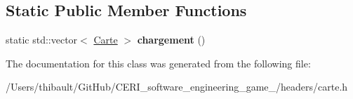 \subsection*{Static Public Member Functions}
\begin{DoxyCompactItemize}
\item 
\mbox{\label{class_carte_aa8b61802fbfda274148ef7b639f0fec8}} 
static std\+::vector$<$ \hyperlink{class_carte}{Carte} $>$ {\bfseries chargement} ()
\end{DoxyCompactItemize}


The documentation for this class was generated from the following file\+:\begin{DoxyCompactItemize}
\item 
/\+Users/thibault/\+Git\+Hub/\+C\+E\+R\+I\+\_\+software\+\_\+engineering\+\_\+game\+\_/headers/carte.\+h\end{DoxyCompactItemize}
